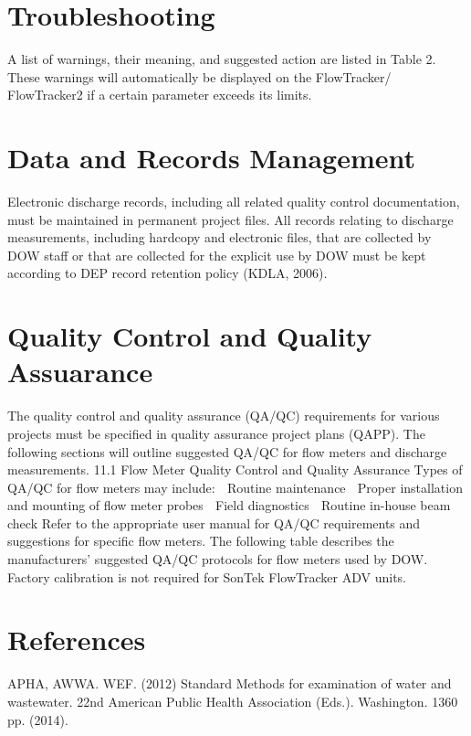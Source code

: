 \documentclass[12pt]{../SOP3_beta}\usepackage[]{graphicx}\usepackage[]{xcolor}
\begin{document}
\section{Troubleshooting}

A list of warnings, their meaning, and suggested action are listed in Table 2. These
warnings will automatically be displayed on the FlowTracker/ FlowTracker2 if a certain
parameter exceeds its limits.

\section{Data and Records Management}

Electronic discharge records, including all related quality control documentation, must
be maintained in permanent project files. All records relating to discharge
measurements, including hardcopy and electronic files, that are collected by DOW staff
or that are collected for the explicit use by DOW must be kept according to DEP record
retention policy (KDLA, 2006).

\section{Quality Control and Quality Assuarance}

The quality control and quality assurance (QA/QC) requirements for various projects
must be specified in quality assurance project plans (QAPP). The following sections will
outline suggested QA/QC for flow meters and discharge measurements.
11.1 Flow Meter Quality Control and Quality Assurance
Types of QA/QC for flow meters may include:
 Routine maintenance
 Proper installation and mounting of flow meter probes
 Field diagnostics
 Routine in-house beam check
Refer to the appropriate user manual for QA/QC requirements and suggestions for
specific flow meters. The following table describes the manufacturers’ suggested
QA/QC protocols for flow meters used by DOW. Factory calibration is not required for
SonTek FlowTracker ADV units.

\section{References}

\NP APHA, AWWA. WEF. (2012) Standard Methods for examination of water and wastewater. 22nd American Public Health Association (Eds.). Washington. 1360 pp. (2014).

\end{document}
